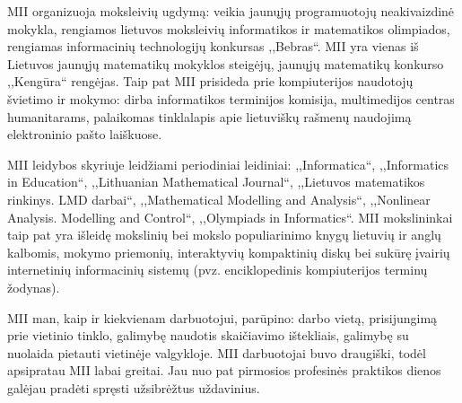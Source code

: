 MII organizuoja moksleivių ugdymą: veikia jaunųjų programuotojų neakivaizdinė mokykla, rengiamos lietuvos moksleivių informatikos ir matematikos olimpiados, rengiamas informacinių technologijų konkursas ,,Bebras``. MII yra vienas iš Lietuvos jaunųjų matematikų mokyklos steigėjų, jaunųjų matematikų konkurso ,,Kengūra`` rengėjas. Taip pat MII prisideda prie kompiuterijos naudotojų švietimo ir mokymo: dirba informatikos terminijos komisija, multimedijos centras humanitarams, palaikomas tinklalapis apie lietuviškų rašmenų naudojimą elektroninio pašto laiškuose.

MII leidybos skyriuje leidžiami periodiniai leidiniai: ,,Informatica``, ,,Informatics in Education``, ,,Lithuanian Mathematical Journal``, ,,Lietuvos matematikos rinkinys. LMD darbai``, ,,Mathematical Modelling and Analysis``, ,,Nonlinear Analysis. Modelling and Control``, ,,Olympiads in Informatics``. MII mokslininkai taip pat yra išleidę mokslinių bei mokslo populiarinimo knygų lietuvių ir anglų kalbomis, mokymo priemonių, interaktyvių kompaktinių diskų bei sukūrę įvairių internetinių informacinių sistemų (pvz. enciklopedinis kompiuterijos terminų žodynas).

MII man, kaip ir kiekvienam darbuotojui, parūpino: darbo vietą, prisijungimą prie vietinio tinklo, galimybę naudotis skaičiavimo ištekliais, galimybę su nuolaida pietauti vietinėje valgykloje. MII darbuotojai buvo draugiški, todėl apsipratau MII labai greitai. Jau nuo pat pirmosios profesinės praktikos dienos galėjau pradėti spręsti užsibrėžtus uždavinius.
